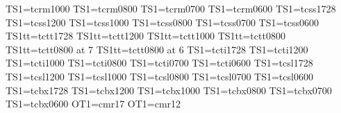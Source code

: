 \hyphenchar\xiitsr \MinusOne%
 TS1\font\tentsr=tcrm1000%
\hyphenchar\tentsr \MinusOne%
 TS1\font\eighttsr=tcrm0800%
\hyphenchar\eighttsr \MinusOne%
 TS1\font\seventsr=tcrm0700%
\hyphenchar\seventsr \MinusOne%
 TS1\font\sixtsr=tcrm0600%
\hyphenchar\sixtsr \MinusOne%
 TS1\font\xviitsf=tcss1728%
\hyphenchar\xviitsf \MinusOne%
 TS1\font\xiitsf=tcss1200%
\hyphenchar\xiitsf \MinusOne%
 TS1\font\tentsf=tcss1000%
\hyphenchar\tentsf \MinusOne%
 TS1\font\eighttsf=tcss0800%
\hyphenchar\eighttsf \MinusOne%
 TS1\font\seventsf=tcss0700%
\hyphenchar\seventsf \MinusOne%
 TS1\font\sixtsf=tcss0600%
\hyphenchar\sixtsf \MinusOne%
 TS1tt\font\xviitst=tctt1728%
\hyphenchar\xviitst \MinusOne%
 TS1tt\font\xiitst=tctt1200%
\hyphenchar\xiitst \MinusOne%
 TS1tt\font\tentst=tctt1000%
\hyphenchar\tentst \MinusOne%
 TS1tt\font\eighttst=tctt0800%
\hyphenchar\eighttst \MinusOne%
 TS1tt\font\seventst=tctt0800 at 7\Unit%
\hyphenchar\seventst \MinusOne%
 TS1tt\font\sixtst=tctt0800 at 6\Unit%
\hyphenchar\sixtst \MinusOne%
 TS1\font\xviitsi=tcti1728%
\hyphenchar\xviitsi \MinusOne%
 TS1\font\xiitsi=tcti1200%
\hyphenchar\xiitsi \MinusOne%
 TS1\font\tentsi=tcti1000%
\hyphenchar\tentsi \MinusOne%
 TS1\font\eighttsi=tcti0800%
\hyphenchar\eighttsi \MinusOne%
 TS1\font\seventsi=tcti0700%
\hyphenchar\seventsi \MinusOne%
 TS1\font\sixtsi=tcti0600%
\hyphenchar\sixtsi \MinusOne%
 TS1\font\xviitsl=tcsl1728%
\hyphenchar\xviitsl \MinusOne%
 TS1\font\xiitsl=tcsl1200%
\hyphenchar\xiitsl \MinusOne%
 TS1\font\tentsl=tcsl1000%
\hyphenchar\tentsl \MinusOne%
 TS1\font\eighttsl=tcsl0800%
\hyphenchar\eighttsl \MinusOne%
 TS1\font\seventsl=tcsl0700%
\hyphenchar\seventsl \MinusOne%
 TS1\font\sixtsl=tcsl0600%
\hyphenchar\sixtsl \MinusOne%
 TS1\font\xviitsb=tcbx1728%
\hyphenchar\xviitsb \MinusOne%
 TS1\font\xiitsb=tcbx1200%
\hyphenchar\xiitsb \MinusOne%
 TS1\font\tentsb=tcbx1000%
\hyphenchar\tentsb \MinusOne%
 TS1\font\eighttsb=tcbx0800%
\hyphenchar\eighttsb \MinusOne%
 TS1\font\seventsb=tcbx0700%
\hyphenchar\seventsb \MinusOne%
 TS1\font\sixtsb=tcbx0600%
\hyphenchar\sixtsb \MinusOne%
 OT1\font\xviirmm=cmr17%
 OT1\font\xiirmm=cmr12%
